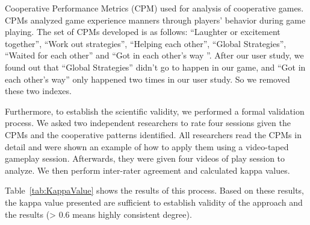Cooperative Performance Metrics (CPM)\cite{CPMs} used for analysis of cooperative games. CPMs analyzed game experience manners through players' behavior during game playing. The set of CPMs developed is as follows: ``Laughter or excitement together'', ``Work out strategies'', ``Helping each other'', ``Global Strategies'', ``Waited for each other'' and ``Got in each other's way ''. 
After our user study, we found out that ``Global Strategies'' didn't go to happen in our game, and ``Got in each other's way'' only happened two times in our user study. So we removed these two indexes.


Furthermore, to establish the scientific validity, we performed a formal validation process. We asked two independent researchers to rate four sessions given the CPMs and the cooperative patterns identified. All researchers read the CPMs in detail and were shown an example of how to apply them using a video-taped gameplay session. Afterwards, they were given four videos of play session to analyze. We then perform inter-rater agreement and calculated kappa values\cite{Kappa1,Kappa2}. 

Table~\ref{tab:KappaValue} shows the results of this process. Based on these results, the kappa value presented are sufficient to establish validity of the approach and the results (> 0.6 means highly consistent degree).

